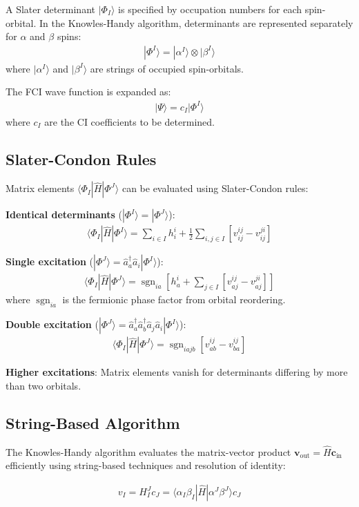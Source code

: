 \documentclass[a4paper,12pt,oneside]{book}
\newcommand{\beq}{\begin{equation}\begin{aligned}}
\newcommand{\eeq}{\end{aligned}\end{equation}}
\newcommand{\op}{\hat}
\newcommand{\vect}{\mathbf}
\DeclareMathOperator{\sgn}{sgn}
\begin{document}
A Slater determinant $|\Phi_I\rangle$ is specified by occupation numbers for each spin-orbital.
In the Knowles-Handy algorithm\cite{knowles84_fci}, determinants are represented separately 
for $\alpha$ and $\beta$ spins:
\beq
|\Phi^I\rangle = |\alpha^I\rangle \otimes |\beta^I\rangle
\eeq
where $|\alpha^I\rangle$ and $|\beta^I\rangle$ are strings of occupied spin-orbitals.

The FCI wave function is expanded as:
\beq
|\Psi\rangle = c_I |\Phi^I\rangle
\eeq
where $c_I$ are the CI coefficients to be determined.

\subsection{Slater-Condon Rules}

Matrix elements $\langle \Phi_I | \op{H} | \Phi^J \rangle$ can be evaluated using 
Slater-Condon rules:

\textbf{Identical determinants} ($|\Phi^I\rangle = |\Phi^J\rangle$):
\beq
\langle \Phi_I | \op{H} | \Phi^I \rangle = \sum_{i \in I} h_i^i 
    + \frac{1}{2} \sum_{i,j \in I} \left[ v_{ij}^{ij} - v_{ij}^{ji} \right]
\eeq

\textbf{Single excitation} ($|\Phi^J\rangle = \op{a}^\dagger_a \op{a}_i |\Phi^I\rangle$):
\beq
\langle \Phi_I | \op{H} | \Phi^J \rangle = \sgn_{ia} \left[ h_{a}^{i} 
    + \sum_{j \in I} \left[ v_{aj}^{ij} - v_{aj}^{ji} \right] \right]
\eeq
where $\sgn_{ia}$ is the fermionic phase factor from orbital reordering.

\textbf{Double excitation} ($|\Phi^J\rangle = \op{a}^\dagger_a \op{a}^\dagger_b \op{a}_j \op{a}_i |\Phi^I\rangle$):
\beq
\langle \Phi_I | \op{H} | \Phi^J \rangle = \sgn_{iajb} \left[ v_{ab}^{ij} - v_{ba}^{ij} \right]
\eeq

\textbf{Higher excitations}: Matrix elements vanish for determinants differing by more than 
two orbitals.

\subsection{String-Based Algorithm}

The Knowles-Handy algorithm\cite{knowles84_fci} evaluates the matrix-vector product 
$\vect{v}_{\text{out}} = \op{H} \vect{c}_{\text{in}}$ efficiently using string-based 
techniques and resolution of identity:

\beq
v_I = H_{I}^{J} c_J = \langle \alpha_I \beta_I | \op{H} | \alpha^J \beta^J \rangle c_J
\eeq
\end{document}
